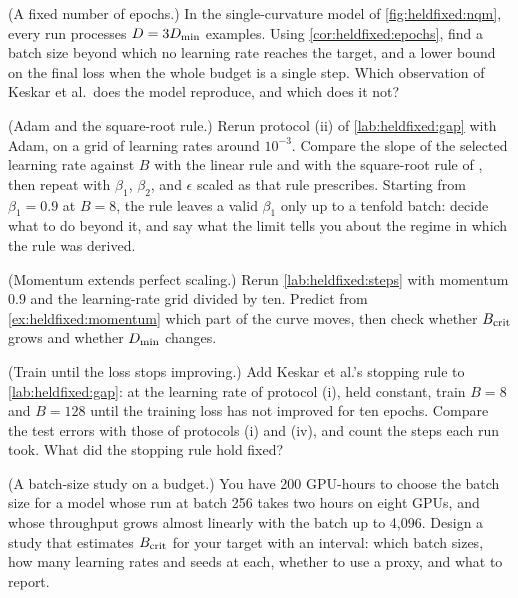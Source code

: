 \begin{refsection}
\begin{exercises}
\item \consolidation (A fixed number of epochs.) In the single-curvature model of \cref{fig:heldfixed:nqm}, every run processes $D=3D_{\min}$ examples. Using \cref{cor:heldfixed:epochs}, find a batch size beyond which no learning rate reaches the target, and a lower bound on the final loss when the whole budget is a single step. Which observation of Keskar et al.\ does the model reproduce, and which does it not?\label{ex:heldfixed:epochs}

\item \labwork (Adam and the square-root rule.) Rerun protocol (ii) of \cref{lab:heldfixed:gap} with Adam, on a grid of learning rates around $10^{-3}$. Compare the slope of the selected learning rate against $B$ with the linear rule and with the square-root rule of \textcite{MalladiEtAl2022}, then repeat with $\beta_1$, $\beta_2$, and $\epsilon$ scaled as that rule prescribes. Starting from $\beta_1=0.9$ at $B=8$, the rule leaves a valid $\beta_1$ only up to a tenfold batch: decide what to do beyond it, and say what the limit tells you about the regime in which the rule was derived.\label{ex:heldfixed:adam}

\item \labwork (Momentum extends perfect scaling.) Rerun \cref{lab:heldfixed:steps} with momentum $0.9$ and the learning-rate grid divided by ten. Predict from \cref{ex:heldfixed:momentum} which part of the curve moves, then check whether $B_{\mathrm{crit}}$ grows and whether $D_{\min}$ changes.\label{ex:heldfixed:momlab}

\item \labwork (Train until the loss stops improving.) Add Keskar et al.'s stopping rule to \cref{lab:heldfixed:gap}: at the learning rate of protocol (i), held constant, train $B=8$ and $B=128$ until the training loss has not improved for ten epochs. Compare the test errors with those of protocols (i) and (iv), and count the steps each run took. What did the stopping rule hold fixed?\label{ex:heldfixed:stopping}

\item \design (A batch-size study on a budget.) You have 200 GPU-hours to choose the batch size for a model whose run at batch 256 takes two hours on eight GPUs, and whose throughput grows almost linearly with the batch up to 4,096. Design a study that estimates $B_{\mathrm{crit}}$ for your target with an interval: which batch sizes, how many learning rates and seeds at each, whether to use a proxy, and what to report.\label{ex:heldfixed:design}


\end{exercises}
\end{refsection}
